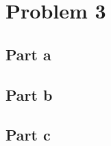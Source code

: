 \documentclass[a4paper, 12pt]{article}
\begin{document}
\begin{sloppypar}
\clearpage
\section{Problem 3}

\subsection{Part a}
\subsection{Part b}
\subsection{Part c}







% 
% 
% 

% 
% 
% 
% 





\end{sloppypar}
\end{document}
